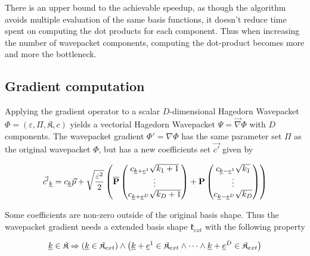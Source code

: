 \documentclass{article}
\begin{document}
There is an upper bound to the achievable speedup, as though the algorithm
avoids multiple evaluation of the same basis functions, it doesn't reduce
time spent on computing the dot products for each component.
Thus when increasing the number of wavepacket components, computing the dot-product becomes
more and more the bottleneck.

\subsection{Gradient computation}
Applying the gradient operator to a scalar \(D\)-dimensional Hagedorn Wavepacket 
\( \Phi = \left( \varepsilon, \Pi, \mathfrak{K}, c \right)\)
yields a vectorial Hagedorn Wavepacket \(\Psi=\vec{\nabla}\Phi\) with \(D\) components.
The wavepacket gradient \(\Phi' = \nabla \Phi\) has the same parameter set \(\Pi\)
as the original wavepacket \(\Phi\), but has a new coefficients set \(\vec{c'}\) given by

\begin{equation}
  \label{eq:compute_grad_coeff}
  \vec{c'}_{\underline{k}}=c_{\underline{k}}\vec{p}+\sqrt{\frac{\varepsilon^2}{2}}
  \left(\mathbf{\overline{P}}
    \begin{pmatrix}
      c_{\underline{k}+\underline{e}^1}\sqrt{k_1+1} \\
      \vdots \\
      c_{\underline{k}+\underline{e}^D}\sqrt{k_D+1} \\
    \end{pmatrix}
    +\mathbf{P}
    \begin{pmatrix}
      c_{\underline{k}-\underline{e}^1}\sqrt{k_1} \\
      \vdots \\
      c_{\underline{k}-\underline{e}^D}\sqrt{k_D} \\
    \end{pmatrix}
  \right)
\end{equation}

Some coefficients are non-zero outside of the original basis shape.
Thus the wavepacket gradient needs a extended basis shape \(\mathfrak{k}_{ext}\)
with the following property

\begin{equation}
  \label{eq:shape_extension_requirement}
  \underline{k} \in \mathfrak{K} \Rightarrow
  \left(
     \underline{k} \in \mathfrak{K}_{ext}
  \right)
  \wedge
  \left(
    \underline{k}+\underline{e}^1 \in \mathfrak{K}_{ext}
    \wedge \dots \wedge
    \underline{k}+\underline{e}^D \in \mathfrak{K}_{ext}
  \right)
\end{equation}
\end{document}
